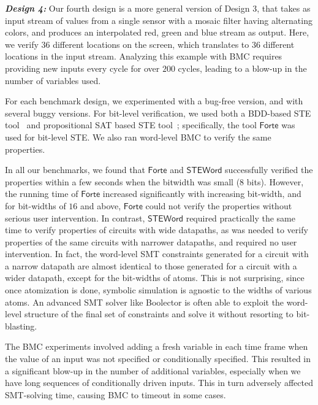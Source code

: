 \documentclass{llncs}
\newcommand{\steword}{\ensuremath{\mathsf{STEWord}}}
\newcommand{\forte}{\ensuremath{\mathsf{Forte}}}
\begin{document}
{\bfseries \emph{Design 4:}} Our fourth design is a more general
version of Design 3, that takes as input stream of values from a
single sensor with a mosaic filter having alternating colors, and
produces an interpolated red, green and blue stream as output.  Here,
we verify $36$ different locations on the screen, which translates to
$36$ different locations in the input stream. Analyzing this example
with BMC requires providing new inputs every cycle for over $200$
cycles, leading to a blow-up in the number of variables used.

For each benchmark design, we experimented with a bug-free version,
and with several buggy versions.  For bit-level verification, we used
both a BDD-based STE tool~\cite{SegerJOMABS05} and propositional SAT
based STE tool~\cite{RoordaClaessen05}; specifically, the tool
{\forte} was used for bit-level STE.  We also ran word-level BMC to
verify the same properties.

In all our benchmarks, we found that {\forte} and {\steword}
successfully verified the properties within a few seconds when the
bitwidth was small ($8$ bits).  However, the running time of {\forte}
increased significantly with increasing bit-width, and for bit-widths
of $16$ and above, {\forte} could not verify the properties without
serious user intervention.  In contrast, {\steword} required
practically the same time to verify properties of circuits with wide
datapaths, as was needed to verify properties of the same circuits
with narrower datapaths, and required no user intervention.  In
fact, the word-level SMT constraints generated for a circuit with a
narrow datapath are almost identical to those generated for a circuit
with a wider datapath, except for the bit-widths of atoms.  This is
not surprising, since once atomization is done, symbolic simulation is
agnostic to the widths of various atoms.  An advanced SMT solver like
Boolector is often able to exploit the word-level structure of the
final set of constraints and solve it without resorting to
bit-blasting.

The BMC experiments involved adding a fresh variable in each time
frame when the value of an input was not specified or conditionally
specified.  This resulted in a significant blow-up in the number of
additional variables, especially when we have long sequences of
conditionally driven inputs.  This in turn adversely affected
SMT-solving time, causing BMC to timeout in some cases.
\end{document}
